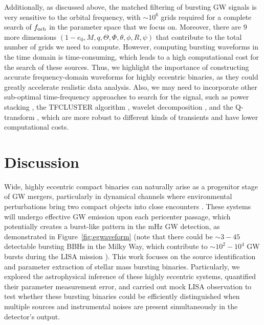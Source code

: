 \documentclass[%
 reprint,
 amsmath,amssymb,
 aps,
]{revtex4-2}
\begin{document}
Additionally, as discussed above, the matched filtering of bursting GW signals is very sensitive to the orbital frequency, with $\sim 10^6$ grids required for a complete search of $f_{\rm orb}$ in the parameter space that we focus on. Moreover, there are 9 more dimensions $(1-e_0, M, q, \Theta,\Phi,\theta,\phi, R,\psi)$ that contribute to the total number of grids we need to compute. However, computing bursting waveforms in the time domain is time-consuming, which leads to a high computational cost for the search of these sources. Thus, we highlight the importance of constructing accurate frequency-domain waveforms for highly eccentric binaries, as they could greatly accelerate realistic data analysis. Also, we may need to incorporate other sub-optimal time-frequency approaches to search for the signal, such as power stacking \citep{east13}, the TFCLUSTER algorithm \citep{sylvestre02}, wavelet decomposition \citep{Klimenko_2004}, and the Q-transform \citep{Chatterji2004Qtransform,Chatterji2006searchburst,bassetti2005development,Tai_2014}, which are more robust to different kinds of transients and have lower computational costs.



\section{Discussion}
\label{sec:discussion}

Wide, highly eccentric compact binaries can naturally arise as a progenitor stage of GW mergers, particularly in dynamical channels where environmental perturbations bring two compact objects into close encounters \citep[see, e.g.,][]{O'Leary+09,Thompson+11,Aarseth+12,Kocsis_2012,breivik16,Gondan_2018a,Orazio+18,Zevin_2019,Samsing+19,Martinez+20,Antonini+19,Kremer_2020,wintergranic2023binary,Gondan_Kocsis2021,Michaely+19,Michaely+20,Michaely+22,wen03,Hoang+18,Hamers+18,Stephan+19,Zevin_2019,Bub+20,Deme+20,Wang+21,Zevin_2021,Xuan+21,Xuan+23b,Mockler+23SMBHtde,Melchor+24TDEcombinedeffect,Xuan24bkg}. These systems will undergo effective GW emission upon each pericenter passage, which potentially creates a burst-like pattern in the mHz GW detection, as demonstrated in Figure~\ref{fig:egwaveform} (note that there could be $\sim 3 - 45$ detectable bursting BBHs in the Milky Way, which contribute to $\sim 10^2 - 10^4$ GW bursts during the LISA mission \citep{Xuan+23b}). This work focuses on the source identification and parameter extraction of stellar mass bursting binaries. Particularly, we explored the astrophysical inference of these highly eccentric systems, quantified their parameter measurement error, and carried out mock LISA observation to test whether these bursting binaries could be efficiently distinguished when multiple sources and instrumental noises are present simultaneously in the detector’s output.
\end{document}

